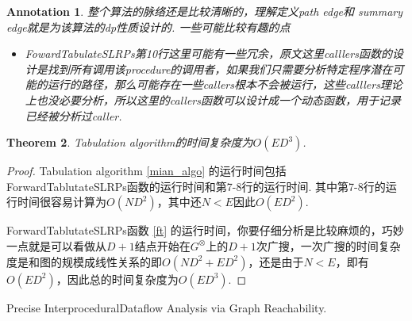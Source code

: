 \documentclass{article}
\newtheorem{theorem}{Theorem}[section]
\newtheorem{annotation}[theorem]{Annotation}
\begin{document}
\newpage

\begin{annotation}
\rm 整个算法的脉络还是比较清晰的，理解定义path edge和 summary edge就是为该算法的dp性质设计的. 一些可能比较有趣的点
\begin{itemize}
	\item FowardTabulateSLRPs第10行这里可能有一些冗余，原文这里calllers函数的设计是找到所有调用该procedure的调用者，如果我们只需要分析特定程序潜在可能的运行的路径，那么可能存在一些callers根本不会被运行，这些calllers理论上也没必要分析，所以这里的callers函数可以设计成一个动态函数，用于记录已经被分析过caller. 
\end{itemize}
\end{annotation}

\begin{theorem}
\rm Tabulation algorithm的时间复杂度为$O(ED^3)$.
\end{theorem}

\begin{proof}
\rm Tabulation algorithm \ref{mian_algo} 的运行时间包括ForwardTablutateSLRPs函数的运行时间和第7-8行的运行时间. 其中第7-8行的运行时间很容易计算为$O(ND^2)$，其中还$N < E$因此$O(ED^2)$. 

ForwardTablutateSLRPs函数 \ref{ft} 的运行时间，你要仔细分析是比较麻烦的，巧妙一点就是可以看做从$D+1$结点开始在$G^\otimes$上的$D+1$次广搜，一次广搜的时间复杂度是和图的规模成线性关系的即$O(ND^2+ED^2)$，还是由于$N < E$，即有$O(ED^2)$，因此总的时间复杂度为$O(ED^3)$. 
\end{proof}

\begin{thebibliography}{9}
Precise InterproceduralDataflow Analysis via Graph Reachability.
\end{thebibliography}
\end{document}
